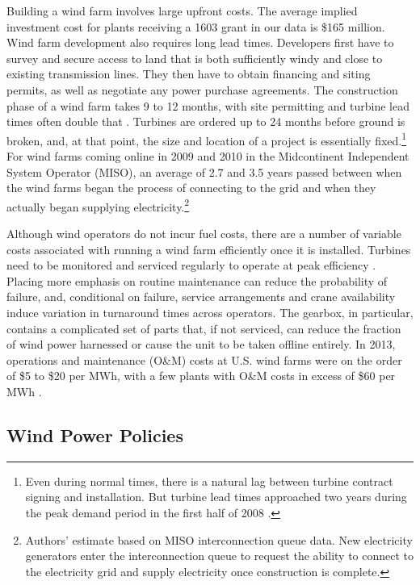 \documentclass[12pt]{article}
\begin{document}
Building a wind farm involves large upfront costs. The average implied investment cost for plants receiving a 1603 grant in our data is \$165 million. Wind farm development also requires long lead times. Developers first have to survey and secure access to land that is both sufficiently windy and close to existing transmission lines. They then have to obtain financing and siting permits, as well as negotiate any power purchase agreements. The construction phase of a wind farm takes 9 to 12 months, with site permitting and turbine lead times often double that \citep{brown_arra_2011}. Turbines are ordered up to 24 months before ground is broken, and, at that point, the size and location of a project is essentially fixed.\footnote{Even during normal times, there is a natural lag between turbine contract signing and installation. But turbine lead times approached two years during the peak demand period in the first half of 2008 \citep[p. 12]{lantz_iea_2012}.} For wind farms coming online in 2009 and 2010 in the Midcontinent Independent System Operator (MISO), an average of 2.7 and 3.5 years passed between when the wind farms began the process of connecting to the grid and when they actually began supplying electricity.\footnote{Authors' estimate based on MISO interconnection queue data. New electricity generators enter the interconnection queue to request the ability to connect to the electricity grid and supply electricity once construction is complete.}

Although wind operators do not incur fuel costs, there are a number of variable costs associated with running a wind farm efficiently once it is installed. Turbines need to be monitored and serviced regularly to operate at peak efficiency \citep{wiser_2013_2014}. Placing more emphasis on routine maintenance can reduce the probability of failure, and, conditional on failure, service arrangements and crane availability induce variation in turnaround times across operators. The gearbox, in particular, contains a complicated set of parts that, if not serviced, can reduce the fraction of wind power harnessed or cause the unit to be taken offline entirely. In 2013, operations and maintenance (O\&M) costs at U.S. wind farms were on the order of \$5 to \$20 per MWh, with a few plants with O\&M costs in excess of \$60 per MWh \citep{wiser_2013_2014}.

\subsection{Wind Power Policies \label{subsec:RenewablePolicies}}
\end{document}
